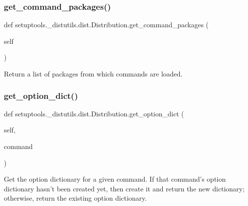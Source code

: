\subsubsection{\texorpdfstring{get\+\_\+command\+\_\+packages()}{get\_command\_packages()}}
{\footnotesize\ttfamily def setuptools.\+\_\+distutils.\+dist.\+Distribution.\+get\+\_\+command\+\_\+packages (\begin{DoxyParamCaption}\item[{}]{self }\end{DoxyParamCaption})}

\begin{DoxyVerb}Return a list of packages from which commands are loaded.\end{DoxyVerb}
 \mbox{\label{classsetuptools_1_1__distutils_1_1dist_1_1Distribution_acc19458816eb97768561cd08f2fba634}} 
\subsubsection{\texorpdfstring{get\+\_\+option\+\_\+dict()}{get\_option\_dict()}}
{\footnotesize\ttfamily def setuptools.\+\_\+distutils.\+dist.\+Distribution.\+get\+\_\+option\+\_\+dict (\begin{DoxyParamCaption}\item[{}]{self,  }\item[{}]{command }\end{DoxyParamCaption})}

\begin{DoxyVerb}Get the option dictionary for a given command.  If that
command's option dictionary hasn't been created yet, then create it
and return the new dictionary; otherwise, return the existing
option dictionary.
\end{DoxyVerb}
 \mbox{\label{classsetuptools_1_1__distutils_1_1dist_1_1Distribution_a72a03ee3bafac26f10ca3e3470c91d59}} 
